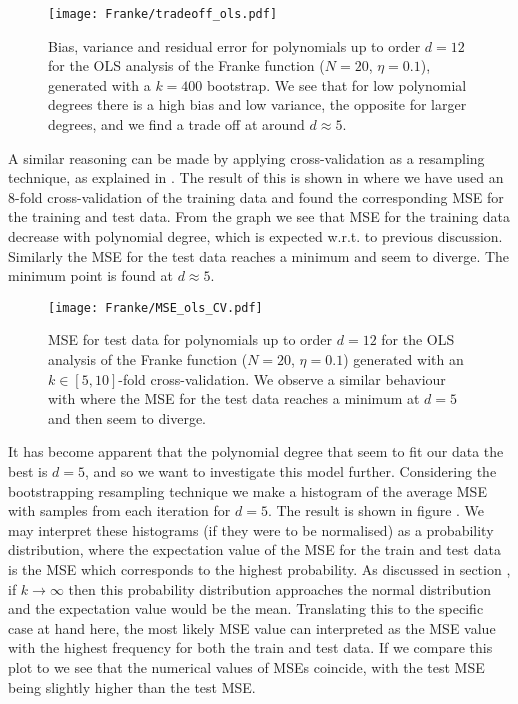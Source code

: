             
            \begin{figure}
                \texttt{[image: Franke/tradeoff\_ols.pdf]}
                \caption{Bias, variance and residual error for polynomials up to order $d=12$ for the OLS analysis of the Franke function ($N=20$, $\eta=0.1$), generated with a $k=400$ bootstrap. We see that for low polynomial degrees there is a high bias and low variance, the opposite for larger degrees, and we find a trade off at around $d\approx 5$.}
                \label{fig:bias_variance_ols}
            \end{figure}
            
            
            A similar reasoning can be made by applying cross-validation as a resampling technique, as explained in . The result of this is shown in  where we have used an 8-fold cross-validation of the training data and found the corresponding MSE for the training and test data. From the graph we see that MSE for the training data decrease with polynomial degree, which is expected w.r.t. to previous discussion. Similarly the MSE for the test data reaches a minimum and seem to diverge. The minimum point is found at $d\approx 5$.

            \begin{figure}
                \texttt{[image: Franke/MSE\_ols\_CV.pdf]}
                \caption{MSE for test data for polynomials up to order $d=12$ for the OLS analysis of the Franke function ($N=20$, $\eta=0.1$) generated with an $k\in[5,10]$-fold cross-validation. We observe a similar behaviour with  where the MSE for the test data reaches a minimum at $d=5$ and then seem to diverge. }
                \label{fig:cross-validation_ols}
            \end{figure} 
            
            It has become apparent that the polynomial degree that seem to fit our data the best is $d=5$, and so we want to investigate this model further. Considering the bootstrapping resampling technique we make a histogram of the average MSE with samples from each iteration for $d=5$. The  result is shown  in figure . We may interpret these histograms (if they were to be normalised) as a probability distribution, where the expectation value of the MSE for the train and test data is the MSE which corresponds to the highest probability. As discussed in section , if $k\to\infty$ then this probability distribution approaches the normal distribution and the expectation value would be the mean. Translating this to the specific case at hand here, the most likely MSE value can interpreted as the MSE value with the highest frequency for both the train and test data. If we compare this plot to  we see that the numerical values of MSEs coincide, with the test MSE being slightly higher than the test MSE. 

